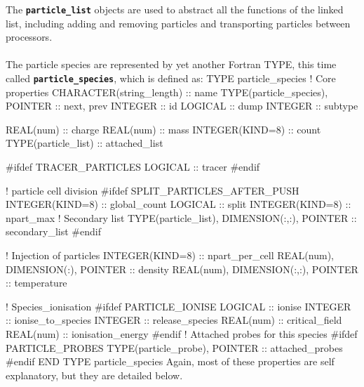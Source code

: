 \documentclass[12pt,a4paper]{article}
\newcommand{\inlinecode}[1]{{\color{warwickred} \bf\texttt{#1}}}
\newenvironment{boxverbatim}{\lboxverbatim{none}}{\endlboxverbatim}
\begin{document}
The \inlinecode{particle\_list} objects are used to abstract all the functions
of the linked list, including adding and removing particles and transporting
particles between processors.\\
\\
The particle species are represented by yet another Fortran TYPE, this time
called \inlinecode{particle\_species}, which is defined as:
\begin{boxverbatim}
  TYPE particle_species
    ! Core properties
    CHARACTER(string_length) :: name
    TYPE(particle_species), POINTER :: next, prev
    INTEGER :: id
    LOGICAL :: dump
    INTEGER :: subtype

    REAL(num) :: charge
    REAL(num) :: mass
    INTEGER(KIND=8) :: count
    TYPE(particle_list) :: attached_list

#ifdef TRACER_PARTICLES
    LOGICAL :: tracer
#endif

    ! particle cell division
#ifdef SPLIT_PARTICLES_AFTER_PUSH
    INTEGER(KIND=8) :: global_count
    LOGICAL :: split
    INTEGER(KIND=8) :: npart_max
    ! Secondary list
    TYPE(particle_list), DIMENSION(:,:), POINTER :: secondary_list
#endif

    ! Injection of particles
    INTEGER(KIND=8) :: npart_per_cell
    REAL(num), DIMENSION(:), POINTER :: density
    REAL(num), DIMENSION(:,:), POINTER :: temperature

    ! Species_ionisation
#ifdef PARTICLE_IONISE
    LOGICAL :: ionise
    INTEGER :: ionise_to_species
    INTEGER :: release_species
    REAL(num) :: critical_field
    REAL(num) :: ionisation_energy
#endif
    ! Attached probes for this species
#ifdef PARTICLE_PROBES
    TYPE(particle_probe), POINTER :: attached_probes
#endif
  END TYPE particle_species
\end{boxverbatim}
Again, most of these properties are self explanatory, but they are detailed
below.
\end{document}
